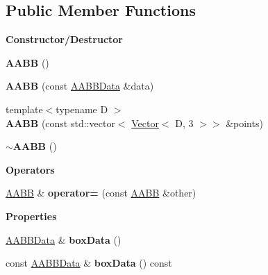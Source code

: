 \subsection*{Public Member Functions}
\begin{Indent}\textbf{ Constructor/\+Destructor}\par
\begin{DoxyCompactItemize}
\item 
\mbox{\label{classrev_1_1_a_a_b_b_af6d1b7b30f9e4819516a85304154b750}} 
{\bfseries A\+A\+BB} ()
\item 
\mbox{\label{classrev_1_1_a_a_b_b_a95e12b578b39a73a071e171ac9451629}} 
{\bfseries A\+A\+BB} (const \mbox{\hyperlink{structrev_1_1_a_a_b_b_data}{A\+A\+B\+B\+Data}} \&data)
\item 
\mbox{\label{classrev_1_1_a_a_b_b_a1f73abf7cfc9afcb73af4302b376f88b}} 
{\footnotesize template$<$typename D $>$ }\\{\bfseries A\+A\+BB} (const std\+::vector$<$ \mbox{\hyperlink{classrev_1_1_vector}{Vector}}$<$ D, 3 $>$$>$ \&points)
\item 
\mbox{\label{classrev_1_1_a_a_b_b_a616548d31fcc98dd3a871ed4395f1a86}} 
{\bfseries $\sim$\+A\+A\+BB} ()
\end{DoxyCompactItemize}
\end{Indent}
\begin{Indent}\textbf{ Operators}\par
\begin{DoxyCompactItemize}
\item 
\mbox{\label{classrev_1_1_a_a_b_b_acaaeff41894979b3b8e8758fd5bbc49e}} 
\mbox{\hyperlink{classrev_1_1_a_a_b_b}{A\+A\+BB}} \& {\bfseries operator=} (const \mbox{\hyperlink{classrev_1_1_a_a_b_b}{A\+A\+BB}} \&other)
\end{DoxyCompactItemize}
\end{Indent}
\begin{Indent}\textbf{ Properties}\par
\begin{DoxyCompactItemize}
\item 
\mbox{\label{classrev_1_1_a_a_b_b_a81474c8dd61c5e2a00bddfa3b802c530}} 
\mbox{\hyperlink{structrev_1_1_a_a_b_b_data}{A\+A\+B\+B\+Data}} \& {\bfseries box\+Data} ()
\item 
\mbox{\label{classrev_1_1_a_a_b_b_a21d9eb0d9d90994045d6a99e38597fbb}} 
const \mbox{\hyperlink{structrev_1_1_a_a_b_b_data}{A\+A\+B\+B\+Data}} \& {\bfseries box\+Data} () const
\end{DoxyCompactItemize}
\end{Indent}
